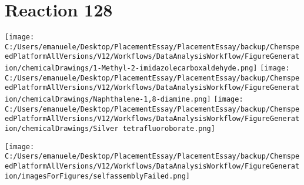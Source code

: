 \documentclass{article}%
\begin{document}
\section*{Reaction 128}%
%
\begin{scheme}[H]%
\begin{minipage}{0.5\textwidth}%
\texttt{[image: C:/Users/emanuele/Desktop/PlacementEssay/PlacementEssay/backup/ChemspeedPlatformAllVersions/V12/Workflows/DataAnalysisWorkflow/FigureGeneration/chemicalDrawings/1-Methyl-2-imidazolecarboxaldehyde.png]}%
\texttt{[image: C:/Users/emanuele/Desktop/PlacementEssay/PlacementEssay/backup/ChemspeedPlatformAllVersions/V12/Workflows/DataAnalysisWorkflow/FigureGeneration/chemicalDrawings/Naphthalene-1,8-diamine.png]}%
\texttt{[image: C:/Users/emanuele/Desktop/PlacementEssay/PlacementEssay/backup/ChemspeedPlatformAllVersions/V12/Workflows/DataAnalysisWorkflow/FigureGeneration/chemicalDrawings/Silver tetrafluoroborate.png]}%
\end{minipage}%
\begin{minipage}{0.5\textwidth}%
\begin{center}%
\texttt{[image: C:/Users/emanuele/Desktop/PlacementEssay/PlacementEssay/backup/ChemspeedPlatformAllVersions/V12/Workflows/DataAnalysisWorkflow/FigureGeneration/imagesForFigures/selfassemblyFailed.png]}%
\end{center}%
\end{minipage}%
\caption{Self-assembly of components 12, 21, with Silver(I) in a 3.0:1.5:1.0 molar ratio in CH$_3$CN at 60\textdegree C for 40h. These are the reagents (starting materials) for reaction 128.}%
\end{scheme}%
\end{document}
